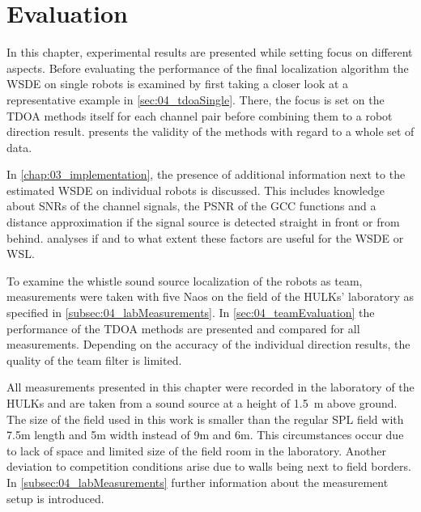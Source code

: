 \chapter{Evaluation}


In this chapter, experimental results are presented while setting
focus on different aspects.
Before evaluating the performance of the final localization algorithm the
\ac{WSDE} on single robots is examined by first taking a closer look
at a representative example in \cref{sec:04_tdoaSingle}.
There, the focus is set on the \ac{TDOA} methods itself for each channel pair
before combining them to a robot direction result.
 presents the validity of the methods with
regard to a whole set of data.

In \cref{chap:03_implementation}, the presence of additional
information next to the estimated \ac{WSDE} on individual robots
is discussed.
This includes knowledge about \acp{SNR} of the channel signals, the \ac{PSNR}
of the \ac{GCC} functions and a distance approximation if the signal source
is detected straight in front or from behind.
 analyses if and to
what extent these factors are useful for the \ac{WSDE} or \ac{WSL}.

To examine the whistle sound source localization of the robots as team,
measurements were taken with five Naos on the field of the HULKs' laboratory
as specified in \cref{subsec:04_labMeasurements}.
In \cref{sec:04_teamEvaluation} the performance of the \ac{TDOA} methods are presented
and compared for all measurements.
Depending on the accuracy of the individual direction results, the quality
of the team filter is limited.

All measurements presented in this chapter were recorded in the
laboratory of the HULKs and are taken from a sound source at a height of
\SI{1.5}{\meter} above ground.
The size of the field used in this work is smaller than the regular \ac{SPL}
field with 7.5\si{m} length and 5\si{m} width instead of 9\si{\meter} and 6\si{\meter}.
This circumstances occur due to lack of space and limited size of the
field room in the laboratory.
Another deviation to competition conditions arise due to walls being next to field borders.
In \cref{subsec:04_labMeasurements} further information about the measurement setup
is introduced.






